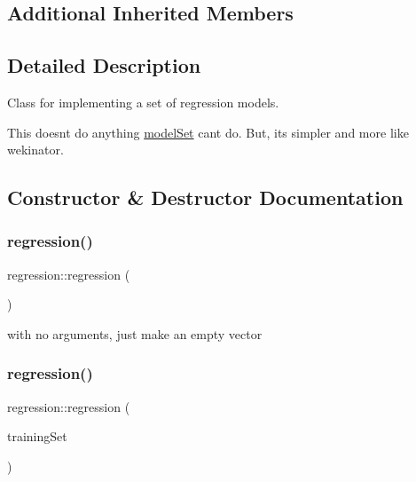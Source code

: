 \subsection*{Additional Inherited Members}


\subsection{Detailed Description}
Class for implementing a set of regression models.

This doesn\textquotesingle{}t do anything \hyperlink{classmodel_set}{model\+Set} can\textquotesingle{}t do. But, it\textquotesingle{}s simpler and more like wekinator. 

\subsection{Constructor \& Destructor Documentation}
\mbox{\label{classregression_a40993153659b1f637cf4d596df6e97ab}} 
\subsubsection{\texorpdfstring{regression()}{regression()}\hspace{0.1cm}{\footnotesize\ttfamily [1/3]}}
{\footnotesize\ttfamily regression\+::regression (\begin{DoxyParamCaption}{ }\end{DoxyParamCaption})}

with no arguments, just make an empty vector \mbox{\label{classregression_ad03f74e09d96f315de3933628e8f4138}} 
\subsubsection{\texorpdfstring{regression()}{regression()}\hspace{0.1cm}{\footnotesize\ttfamily [2/3]}}
{\footnotesize\ttfamily regression\+::regression (\begin{DoxyParamCaption}\item[{std\+::vector$<$ \hyperlink{structtraining_example}{training\+Example} $>$}]{training\+Set }\end{DoxyParamCaption})}

